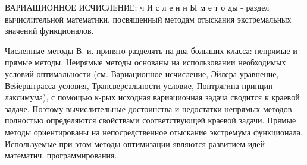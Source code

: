\documentclass[10pt]{article}
\begin{document}
ВАРИАЩИОННОЕ ИСЧИСЛЕНИЕ; ч И с л е н н Ы м е т о ды - раздел вычислительной математики, посвященный методам отыскания экстремальных значений функционалов.



Численные методы В. и. принято разделять на два болыших класса: непрямые и прямые методы. Неирямые методы основаны на использовании необходимых условий оптимальности (см. Вариационное исчисление, Эйлера уравнение, Вейерштрасса условия, Трансверсальности условие, Понтрягина принцип лаксимума), с помощью к-рых исходная вариационная задача сводится к краевой задаче. Поэтому вычислительные достоинства и недостатки непрямых методов полностью определяются свойствами соответствующей краевой задачи. Прямые методы ориентированы на непосредственное отыскание экстремума функционала. Используемые при этом методы оптимизации являются развитием идей математич. программирования.
\end{document}
